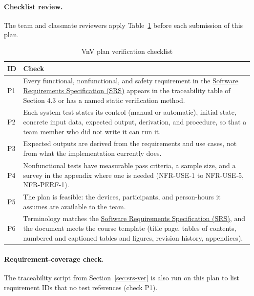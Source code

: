 \documentclass[12pt, titlepage]{article}
\newcommand{\srsref}[1]{#1}
\begin{document}
\paragraph{Checklist review.} The team and classmate reviewers apply
Table~\ref{tab:vv-checklist} before each submission of this plan.

\begin{table}[htbp]
\centering\small
\caption{VnV plan verification checklist}
\label{tab:vv-checklist}
\renewcommand{\arraystretch}{1.2}
\begin{tabularx}{\textwidth}{l >{\raggedright\arraybackslash}X}
\toprule
\textbf{ID} & \textbf{Check}\\
\midrule
P1 & Every functional, nonfunctional, and safety requirement in the \href{https://github.com/meena-alomran/game-n-grow/blob/main/pdfs/SRS-IEEE/SRS.pdf}{Software Requirements Specification (SRS)} appears
in the traceability table of Section 4.3 or has a named static verification
method.\\
P2 & Each system test states its control (manual or automatic), initial state,
concrete input data, expected output, derivation, and procedure, so that a
team member who did not write it can run it.\\
P3 & Expected outputs are derived from the requirements and use cases, not from
what the implementation currently does.\\
P4 & Nonfunctional tests have measurable pass criteria, a sample size, and a
survey in the appendix where one is needed (\srsref{NFR-USE-1} to \srsref{NFR-USE-5},
\srsref{NFR-PERF-1}).\\
P5 & The plan is feasible: the devices, participants, and person-hours it
assumes are available to the team.\\
P6 & Terminology matches the \href{https://github.com/meena-alomran/game-n-grow/blob/main/pdfs/SRS-IEEE/SRS.pdf}{Software Requirements Specification (SRS)}, and the document meets the course template
(title page, tables of contents, numbered and captioned tables and figures,
revision history, appendices).\\
\bottomrule
\end{tabularx}
\end{table}

\paragraph{Requirement-coverage check.} The traceability script from
Section~\ref{sec:srs-ver} is also run on this plan to list requirement IDs
that no test references (check P1).
\end{document}
